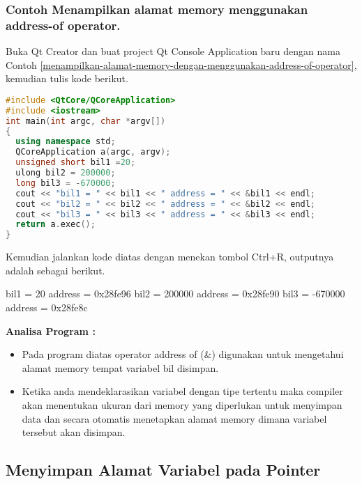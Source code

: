 \subsubsection*{Contoh  Menampilkan alamat memory menggunakan address-of operator.}

Buka Qt Creator dan buat project Qt Console Application baru dengan nama
Contoh \ref{menampilkan-alamat-memory-dengan-menggunakan-address-of-operator}, kemudian tulis kode berikut.

\begin{lstlisting}[language=c++, caption=Menampilkan alamat memory menggunakan address-of operator, label=menampilkan-alamat-memory-dengan-menggunakan-address-of-operator]
#include <QtCore/QCoreApplication>
#include <iostream>
int main(int argc, char *argv[])
{
  using namespace std;
  QCoreApplication a(argc, argv);
  unsigned short bil1 =20;
  ulong bil2 = 200000;
  long bil3 = -670000;
  cout << "bil1 = " << bil1 << " address = " << &bil1 << endl;
  cout << "bil2 = " << bil2 << " address = " << &bil2 << endl;
  cout << "bil3 = " << bil3 << " address = " << &bil3 << endl;
  return a.exec();
}
\end{lstlisting}

Kemudian jalankan kode diatas dengan menekan tombol Ctrl+R, outputnya
adalah sebagai berikut.

\begin{lcverbatim}
bil1 = 20 address = 0x28fe96 
bil2 = 200000 address = 0x28fe90 
bil3 = -670000 address = 0x28fe8c
\end{lcverbatim}

\textbf{Analisa Program :}

\begin{itemize}
\tightlist
\item
  Pada program diatas operator address of (\&) digunakan untuk
  mengetahui alamat memory tempat variabel bil disimpan.
\item
  Ketika anda mendeklarasikan variabel dengan tipe tertentu maka
  compiler akan menentukan ukuran dari memory yang diperlukan untuk
  menyimpan data dan secara otomatis menetapkan alamat memory dimana
  variabel tersebut akan disimpan.
\end{itemize}

\subsection{Menyimpan Alamat Variabel pada
Pointer}\label{menyimpan-alamat-variabel-pada-pointer}

